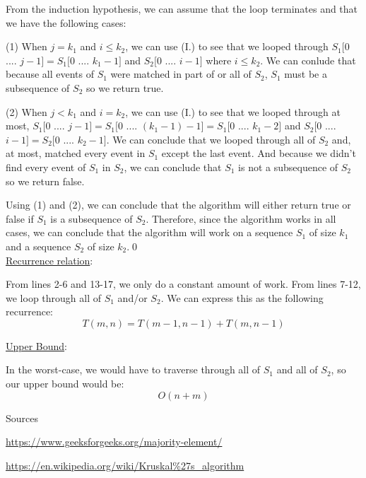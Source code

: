 \documentclass[11pt]{article}
\begin{document}
\begin{itemize}
From the induction hypothesis, we can assume that the loop terminates and that we have the following cases:

(1) When $j = k_1$ and $i \leq k_2$, we can use (I.) to see that we looped through $S_1[0$ .... $j-1] = S_1[0$ .... $k_1-1]$ and $S_2[0$ .... $i-1]$ where $i \leq k_2$. We can conlude that because all events of $S_1$ were matched in part of or all of $S_2$, $S_1$ must be a subsequence of $S_2$ so we return true.

(2) When $j < k_1$ and $i = k_2$, we can use (I.) to see that we looped through at most, $S_1[0$ .... $j-1] = S_1[0$ .... $(k_1 - 1) -1] = S_1[0$ .... $k_1-2]$ and $S_2[0$ .... $i-1] = S_2[0$ .... $k_2-1]$. We can conclude that we looped through all of $S_2$ and, at most, matched every event in $S_1$ except the last event. And because we didn't find every event of $S_1$ in $S_2$, we can conclude that $S_1$ is not a subsequence of $S_2$ so we return false.

Using (1) and (2), we can conclude that the algorithm will either return true or false if $S_1$ is a subsequence of $S_2$. Therefore, since the algorithm works in all cases, we can conclude that the algorithm will work on a sequence $S_1$ of size $k_1$ and a sequence $S_2$ of size $k_2$.\hspace{5cm}\qed\\

\underline{Recurrence relation}:

From lines 2-6 and 13-17, we only do a constant amount of work. From lines 7-12, we loop through all of $S_1$ and/or $S_2$. We can express this as the following recurrence: $$\boxed{T(m, n) = T(m - 1, n - 1) + T(m , n - 1)}$$

\underline{Upper Bound}:

In the worst-case, we would have to traverse through all of $S_1$ and all of $S_2$, so our upper bound would be:$$\boxed{O(n + m)}$$

\end{itemize}

\begin{center}
Sources
\end{center}

\url{https://www.geeksforgeeks.org/majority-element/}

\url{https://en.wikipedia.org/wiki/Kruskal\%27s_algorithm}
\end{document}
